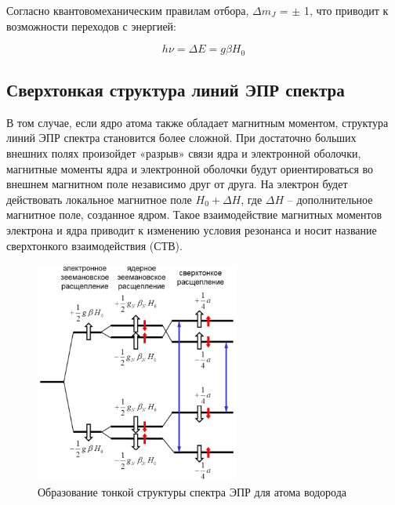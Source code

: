 \documentclass{article}
\begin{document}
Согласно квантовомеханическим правилам отбора, $ \Delta m_{J}$ = $ \pm $ 1, что приводит к возможности переходов с энергией:

\begin{equation}
h\nu = \Delta E = g \beta H_{0}
\end{equation}

\subsection{Сверхтонкая структура линий ЭПР спектра}

В том случае, если ядро атома также обладает магнитным моментом, структура линий ЭПР спектра становится более сложной. При достаточно больших внешних полях произойдет «разрыв» связи ядра и электронной оболочки, магнитные моменты ядра и электронной оболочки будут ориентироваться во внешнем магнитном поле независимо друг от друга. На электрон будет действовать локальное магнитное поле $H_0 + \Delta H$, где $ \Delta H$ – дополнительное магнитное поле, созданное ядром. Такое взаимодействие магнитных моментов электрона и ядра приводит к изменению условия резонанса и носит название сверхтонкого взаимодействия (СТВ).

\begin{figure}[h!]
	\begin{center}
		\includegraphics[width=0.6\textwidth]{pic2.png}
	\end{center}
	\caption{Образование тонкой структуры спектра ЭПР для атома водорода}
	\label{pic2}
\end{figure}
\end{document}
